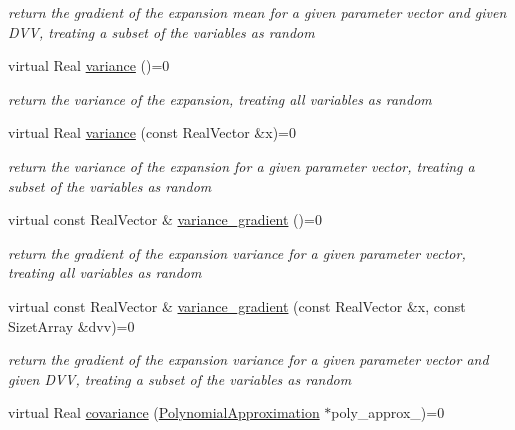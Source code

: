 \begin{DoxyCompactItemize}
\begin{DoxyCompactList}\small\item\em return the gradient of the expansion mean for a given parameter vector and given D\+VV, treating a subset of the variables as random \end{DoxyCompactList}\item 
virtual Real \hyperlink{classPecos_1_1PolynomialApproximation_ac20ad205d017d71c3c6b209c1dfafe6f}{variance} ()=0\label{classPecos_1_1PolynomialApproximation_ac20ad205d017d71c3c6b209c1dfafe6f}

\begin{DoxyCompactList}\small\item\em return the variance of the expansion, treating all variables as random \end{DoxyCompactList}\item 
virtual Real \hyperlink{classPecos_1_1PolynomialApproximation_aa605184b6960045162f94a4f0302d95e}{variance} (const Real\+Vector \&x)=0\label{classPecos_1_1PolynomialApproximation_aa605184b6960045162f94a4f0302d95e}

\begin{DoxyCompactList}\small\item\em return the variance of the expansion for a given parameter vector, treating a subset of the variables as random \end{DoxyCompactList}\item 
virtual const Real\+Vector \& \hyperlink{classPecos_1_1PolynomialApproximation_a9d096037fca9bfcc8af60186bf6e914f}{variance\+\_\+gradient} ()=0\label{classPecos_1_1PolynomialApproximation_a9d096037fca9bfcc8af60186bf6e914f}

\begin{DoxyCompactList}\small\item\em return the gradient of the expansion variance for a given parameter vector, treating all variables as random \end{DoxyCompactList}\item 
virtual const Real\+Vector \& \hyperlink{classPecos_1_1PolynomialApproximation_a1222664e145d8077eea75bfff3aca15a}{variance\+\_\+gradient} (const Real\+Vector \&x, const Sizet\+Array \&dvv)=0\label{classPecos_1_1PolynomialApproximation_a1222664e145d8077eea75bfff3aca15a}

\begin{DoxyCompactList}\small\item\em return the gradient of the expansion variance for a given parameter vector and given D\+VV, treating a subset of the variables as random \end{DoxyCompactList}\item 
virtual Real \hyperlink{classPecos_1_1PolynomialApproximation_a7e3e8ebdd9b22e460cc4c97528b5c2e2}{covariance} (\hyperlink{classPecos_1_1PolynomialApproximation}{Polynomial\+Approximation} $\ast$poly\+\_\+approx\+\_)=0\label{classPecos_1_1PolynomialApproximation_a7e3e8ebdd9b22e460cc4c97528b5c2e2}


\end{DoxyCompactItemize}
